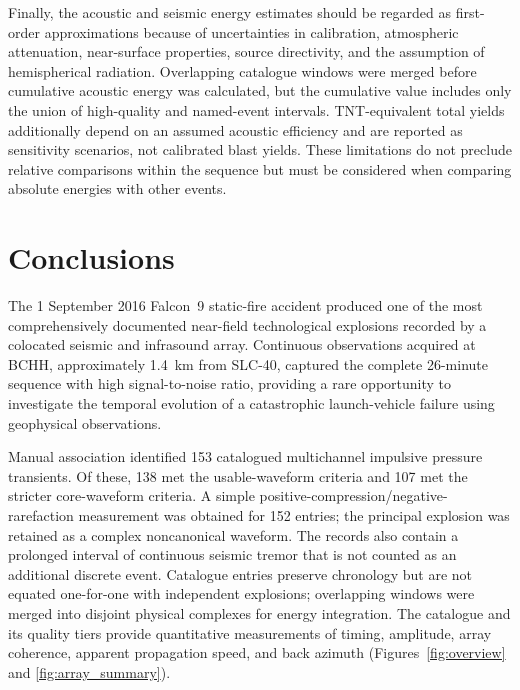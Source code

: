 \documentclass[]{seismica}
\begin{document}
Finally, the acoustic and seismic energy estimates should be regarded as
first-order approximations because of uncertainties in calibration,
atmospheric attenuation, near-surface properties, source directivity, and the
assumption of hemispherical radiation. Overlapping catalogue windows were
merged before cumulative acoustic energy was calculated, but the cumulative
value includes only the union of high-quality and named-event intervals.
TNT-equivalent total yields additionally depend on an assumed acoustic
efficiency and are reported as sensitivity scenarios, not calibrated blast
yields. These limitations do not preclude relative comparisons within the
sequence but must be considered when comparing absolute energies with other
events.

\section{Conclusions}
\label{sec:conclusions}

The 1 September 2016 Falcon~9 static-fire accident produced one of the most comprehensively documented near-field technological explosions recorded by a colocated seismic and infrasound array. Continuous observations acquired at BCHH, approximately 1.4~km from SLC-40, captured the complete 26-minute sequence with high signal-to-noise ratio, providing a rare opportunity to investigate the temporal evolution of a catastrophic launch-vehicle failure using geophysical observations.

Manual association identified 153 catalogued multichannel impulsive pressure
transients. Of these, 138 met the usable-waveform criteria and 107 met the
stricter core-waveform criteria. A simple
positive-compression/negative-rarefaction measurement was obtained for 152
entries; the principal explosion was retained as a complex noncanonical
waveform. The records also contain a prolonged interval of continuous seismic
tremor that is not counted as an additional discrete event. Catalogue entries
preserve chronology but are not equated one-for-one with independent
explosions; overlapping windows were merged into disjoint physical complexes
for energy integration. The catalogue and its quality tiers provide
quantitative measurements of timing, amplitude, array coherence, apparent
propagation speed, and back azimuth (Figures~\ref{fig:overview} and
\ref{fig:array_summary}).
\end{document}
